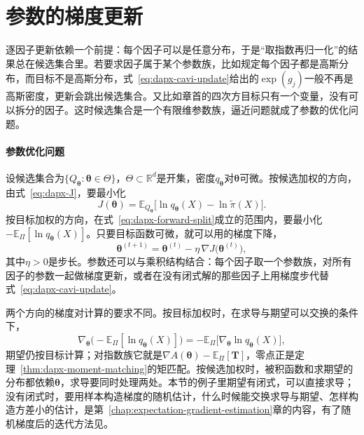 \section{参数的梯度更新}
\label{sec:dapx-gradient}

逐因子更新依赖一个前提：每个因子可以是任意分布，于是“取指数再归一化”的结果总在候选集合里。若要求因子属于某个参数族，比如规定每个因子都是高斯分布，而目标不是高斯分布，式~\eqref{eq:dapx-cavi-update}给出的$\exp(g_j)$一般不再是高斯密度，更新会跳出候选集合。又比如章首的四次方目标只有一个变量，没有可以拆分的因子。这时候选集合是一个有限维参数族，逼近问题就成了参数的优化问题。

\paragraph{参数优化问题}
设候选集合为$\{Q_{\bm{\theta}}:\bm{\theta}\in\Theta\}$，$\Theta\subset\mathbb{R}^{d}$是开集，密度$q_{\bm{\theta}}$对$\bm{\theta}$可微。按候选加权的方向，由式~\eqref{eq:dapx-J}，要最小化
\begin{equation}
 J(\bm{\theta})=\mathbb{E}_{Q_{\bm{\theta}}}\bigl[\ln q_{\bm{\theta}}(X)-\ln\widetilde{\pi}(X)\bigr] .
 \label{eq:dapx-J-theta}
\end{equation}
按目标加权的方向，在式~\eqref{eq:dapx-forward-split}成立的范围内，要最小化$-\mathbb{E}_{\Pi}[\ln q_{\bm{\theta}}(X)]$。只要目标函数可微，就可以用的梯度下降，
\begin{equation}
 \bm{\theta}^{(t+1)}=\bm{\theta}^{(t)}-\eta\,\nabla J\bigl(\bm{\theta}^{(t)}\bigr) ,
 \label{eq:dapx-gd}
\end{equation}
其中$\eta>0$是步长。参数还可以与乘积结构结合：每个因子取一个参数族，对所有因子的参数一起做梯度更新，或者在没有闭式解的那些因子上用梯度步代替式~\eqref{eq:dapx-cavi-update}。

两个方向的梯度对计算的要求不同。按目标加权时，在求导与期望可以交换的条件下，
\[
 \nabla_{\bm{\theta}}\bigl(-\mathbb{E}_{\Pi}[\ln q_{\bm{\theta}}(X)]\bigr)=-\mathbb{E}_{\Pi}\bigl[\nabla_{\bm{\theta}}\ln q_{\bm{\theta}}(X)\bigr] ,
\]
期望仍按目标计算；对指数族它就是$\nabla A(\bm{\theta})-\mathbb{E}_{\Pi}[\bm{T}]$，零点正是定理~\ref{thm:dapx-moment-matching}的矩匹配。按候选加权时，被积函数和求期望的分布都依赖$\bm{\theta}$，求导要同时处理两处。本节的例子里期望有闭式，可以直接求导；没有闭式时，要用样本构造梯度的随机估计，什么时候能交换求导与期望、怎样构造方差小的估计，是第~\ref{chap:expectation-gradient-estimation}章的内容，有了随机梯度后的迭代方法见。

